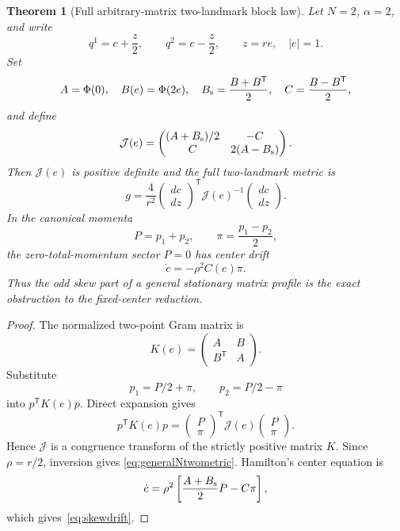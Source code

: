 \documentclass[11pt]{article}
\newtheorem{theorem}{Theorem}
\begin{document}
\begin{theorem}[Full arbitrary-matrix two-landmark block law]
\label{thm:generalNtwo}
Let \(N=2\), \(\alpha=2\), and write
\[
 q^1=c+\frac z2,\qquad q^2=c-\frac z2,\qquad z=re,\quad |e|=1.
\]
Set
\[
 A=\Phi(0),\quad B(e)=\Phi(2e),\quad
 B_{\rm s}=\frac{B+B^{\mathsf T}}2,\quad
 C=\frac{B-B^{\mathsf T}}2,
\]
and define
\begin{equation}
 \mathcal J(e)=
 \begin{pmatrix}
  (A+B_{\rm s})/2&-C\\
  C&2(A-B_{\rm s})
 \end{pmatrix}.
 \label{eq:generalNtwoJ}
\end{equation}
Then \(\mathcal J(e)\) is positive definite and the full two-landmark
metric is
\begin{equation}
 \boxed{\qquad
 g=\frac4{r^2}
 \begin{pmatrix}dc\\ dz\end{pmatrix}^{\mathsf T}
 \mathcal J(e)^{-1}
 \begin{pmatrix}dc\\ dz\end{pmatrix}.
 \qquad}
 \label{eq:generalNtwometric}
\end{equation}
In the canonical momenta
\[
 P=p_1+p_2,\qquad \pi=\frac{p_1-p_2}{2},
\]
the zero-total-momentum sector \(P=0\) has center drift
\begin{equation}
 \dot c=-\rho^2 C(e)\pi.
 \label{eq:skewdrift}
\end{equation}
Thus the odd skew part of a general stationary matrix profile is the exact
obstruction to the fixed-center reduction.
\end{theorem}

\begin{proof}
The normalized two-point Gram matrix is
\[
 K(e)=
 \begin{pmatrix}A&B\\B^{\mathsf T}&A\end{pmatrix}.
\]
Substitute
\[
 p_1=P/2+\pi,\qquad p_2=P/2-\pi
\]
into \(p^{\mathsf T}K(e)p\).  Direct expansion gives
\[
 p^{\mathsf T}K(e)p
 =
 \begin{pmatrix}P\\ \pi\end{pmatrix}^{\mathsf T}
 \mathcal J(e)
 \begin{pmatrix}P\\ \pi\end{pmatrix}.
\]
Hence \(\mathcal J\) is a congruence transform of the strictly positive
matrix \(K\).  Since \(\rho=r/2\), inversion gives
\eqref{eq:generalNtwometric}.  Hamilton's center equation is
\[
 \dot c=\rho^2\left[\frac{A+B_{\rm s}}2P-C\pi\right],
\]
which gives~\eqref{eq:skewdrift}.
\end{proof}
\end{document}
